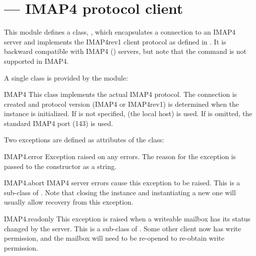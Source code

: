 
\section{ ---
         IMAP4 protocol client}



This module defines a class, , which encapsulates a
connection to an IMAP4 server and implements the IMAP4rev1 client
protocol as defined in . It is backward compatible with
IMAP4 () servers, but note that the  command is
not supported in IMAP4.

A single class is provided by the  module:

\begin{classdesc}{IMAP4}{}
This class implements the actual IMAP4 protocol.  The connection is
created and protocol version (IMAP4 or IMAP4rev1) is determined when
the instance is initialized.
If  is not specified,  (the local host) is used.
If  is omitted, the standard IMAP4 port (143) is used.
\end{classdesc}

Two exceptions are defined as attributes of the  class:

\begin{excdesc}{IMAP4.error}
Exception raised on any errors.  The reason for the exception is
passed to the constructor as a string.
\end{excdesc}

\begin{excdesc}{IMAP4.abort}
IMAP4 server errors cause this exception to be raised.  This is a
sub-class of .  Note that closing the instance
and instantiating a new one will usually allow recovery from this
exception.
\end{excdesc}

\begin{excdesc}{IMAP4.readonly}
This exception is raised when a writeable mailbox has its status changed by the server.  This is a
sub-class of .  Some other client now has write permission,
and the mailbox will need to be re-opened to re-obtain write permission.
\end{excdesc}

